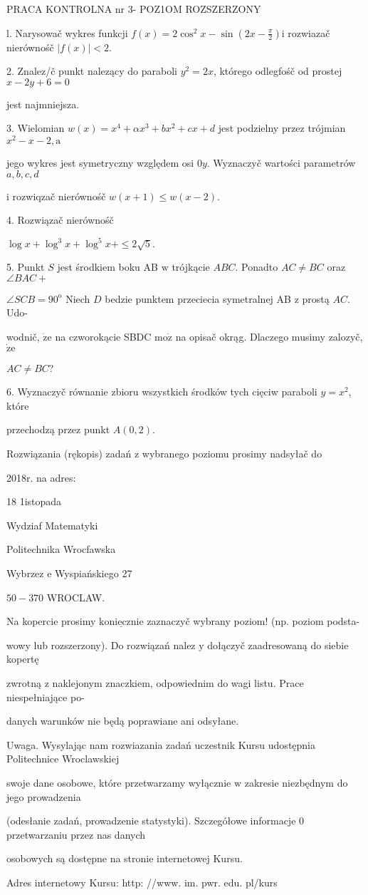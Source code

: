 \documentclass[a4paper,12pt]{article}
\begin{document}
PRACA KONTROLNA nr 3- POZ1OM ROZSZERZONY

l. Narysowač wykres funkcji $f(x)=2\displaystyle \cos^{2}x-\sin(2x-\frac{\pi}{2})\mathrm{i}$ rozwiazač nierównośč $|f(x)|<2.$

2. Znalez/č punkt nalezący do paraboli $y^{2}=2x$, którego odlegfośč od prostej $x-2y+6=0$

jest najmniejsza.

3. Wielomian $w(x)=x^{4}+\alpha x^{3}+bx^{2}+cx+d$ jest podzielny przez trójmian $x^{2}-x-2, \mathrm{a}$

jego wykres jest symetryczny względem osi $0y$. Wyznaczyč wartości parametrów $a, b, c, d$

$\mathrm{i}$ rozwiqzač nierównośč $w(x+1)\leq w(x-2).$

4. Rozwiązač nierównośč

$\log x+\log^{3}x+\log^{5}x+\leq 2\sqrt{5}.$

5. Punkt $S$ jest środkiem boku AB $\mathrm{w}$ trójkącie $ABC$. Ponadto $AC\neq BC$ oraz $\angle BAC+$

$\angle SCB=90^{\mathrm{o}}$ Niech $D$ bedzie punktem przeciecia symetralnej AB $\mathrm{z}$ prostą $AC$. Udo-

wodnič, $\dot{\mathrm{z}}\mathrm{e}$ na czworokącie SBDC $\mathrm{m}\mathrm{o}\dot{\mathrm{z}}$ na opisač okrąg. Dlaczego musimy zalozyč, $\dot{\mathrm{z}}\mathrm{e}$

$AC\neq BC$?

6. Wyznaczyč równanie zbioru wszystkich środków tych cięciw paraboli $y = x^{2}$, które

przechodzą przez punkt $A(0,2).$

Rozwiązania (rękopis) zadań z wybranego poziomu prosimy nadsyłač do

2018r. na adres:

18 1istopada

Wydziaf Matematyki

Politechnika Wrocfawska

Wybrzez $\mathrm{e}$ Wyspiańskiego 27

$50-370$ WROCLAW.

Na kopercie prosimy $\underline{\mathrm{k}\mathrm{o}\mathrm{n}\mathrm{i}\mathrm{e}\mathrm{c}\mathrm{z}\mathrm{n}\mathrm{i}\mathrm{e}}$ zaznaczyč wybrany poziom! (np. poziom podsta-

wowy lub rozszerzony). Do rozwiązań nalez $\mathrm{y}$ dołączyč zaadresowaną do siebie kopertę

zwrotną $\mathrm{z}$ naklejonym znaczkiem, odpowiednim do wagi listu. Prace niespełniające po-

danych warunków nie będą poprawiane ani odsyłane.

Uwaga. Wysylając nam rozwiazania zadań uczestnik Kursu udostępnia Politechnice Wroclawskiej

swoje dane osobowe, które przetwarzamy wyłącznie $\mathrm{w}$ zakresie niezbędnym do jego prowadzenia

(odesłanie zadań, prowadzenie statystyki). Szczegółowe informacje $0$ przetwarzaniu przez nas danych

osobowych są dostępne na stronie internetowej Kursu.

Adres internetowy Kursu: http: //www. im. pwr. edu. pl/kurs
\end{document}
